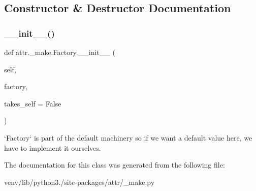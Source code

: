 \subsection{Constructor \& Destructor Documentation}
\mbox{\label{classattr_1_1__make_1_1_factory_a58b9a79c6890af8b87ac19dbdf00703c}} 
\subsubsection{\texorpdfstring{\+\_\+\+\_\+init\+\_\+\+\_\+()}{\_\_init\_\_()}}
{\footnotesize\ttfamily def attr.\+\_\+make.\+Factory.\+\_\+\+\_\+init\+\_\+\+\_\+ (\begin{DoxyParamCaption}\item[{}]{self,  }\item[{}]{factory,  }\item[{}]{takes\+\_\+self = {\ttfamily False} }\end{DoxyParamCaption})}

\begin{DoxyVerb}`Factory` is part of the default machinery so if we want a default
value here, we have to implement it ourselves.
\end{DoxyVerb}
 

The documentation for this class was generated from the following file\+:\begin{DoxyCompactItemize}
\item 
venv/lib/python3./site-\/packages/attr/\+\_\+make.\+py\end{DoxyCompactItemize}
